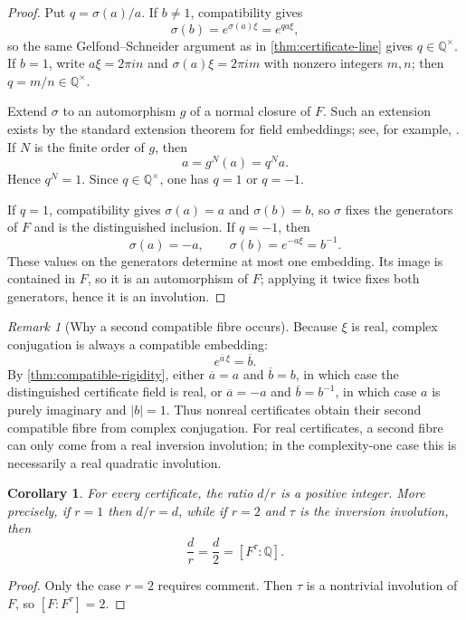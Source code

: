 \documentclass[11pt]{article}
\newcommand{\QQ}{\mathbb Q}
\newtheorem{corollary}[theorem]{Corollary}
\theoremstyle{definition}
\theoremstyle{remark}
\newtheorem{remark}[theorem]{Remark}
\numberwithin{equation}{section}
\begin{document}
\begin{proof}
Put $q=\sigma(a)/a$.  If $b\ne1$, compatibility gives
\[
 \sigma(b)=e^{\sigma(a)\xi}=e^{q a\xi},
\]
so the same Gelfond--Schneider argument as in
\cref{thm:certificate-line} gives $q\in\QQ^\times$.  If $b=1$, write
$a\xi=2\pi i n$ and $\sigma(a)\xi=2\pi i m$ with nonzero integers
$m,n$; then $q=m/n\in\QQ^\times$.

Extend $\sigma$ to an automorphism $g$ of a normal closure of $F$.
Such an extension exists by the standard extension theorem for field
embeddings; see, for example, \cite[Chapter~I]{Neukirch1999}.  If $N$
is the finite order of $g$, then
\[
 a=g^N(a)=q^N a.
\]
Hence $q^N=1$.  Since $q\in\QQ^\times$, one has $q=1$ or $q=-1$.

If $q=1$, compatibility gives $\sigma(a)=a$ and $\sigma(b)=b$, so
$\sigma$ fixes the generators of $F$ and is the distinguished
inclusion.  If $q=-1$, then
\[
 \sigma(a)=-a,
 \qquad
 \sigma(b)=e^{-a\xi}=b^{-1}.
\]
These values on the generators determine at most one embedding.  Its
image is contained in $F$, so it is an automorphism of $F$; applying it
twice fixes both generators, hence it is an involution.
\end{proof}

\begin{remark}[Why a second compatible fibre occurs]
\label{rem:complex-conjugation}
Because $\xi$ is real, complex conjugation is always a compatible
embedding:
\[
 e^{\overline a\,\xi}=\overline b.
\]
By \cref{thm:compatible-rigidity}, either
$\overline a=a$ and $\overline b=b$, in which case the distinguished
certificate field is real, or
$\overline a=-a$ and $\overline b=b^{-1}$, in which case $a$ is purely
imaginary and $|b|=1$.  Thus nonreal certificates obtain their second
compatible fibre from complex conjugation.  For real certificates, a
second fibre can only come from a real inversion involution; in the
complexity-one case this is necessarily a real quadratic involution.
\end{remark}

\begin{corollary}\label{cor:integer-ratio}
For every certificate, the ratio $d/r$ is a positive integer.  More
precisely, if $r=1$ then $d/r=d$, while if $r=2$ and $\tau$ is the
inversion involution, then
\[
 \frac dr=\frac d2=[F^\tau:\QQ].
\]
\end{corollary}

\begin{proof}
Only the case $r=2$ requires comment.  Then $\tau$ is a nontrivial
involution of $F$, so $[F:F^\tau]=2$.
\end{proof}
\end{document}
